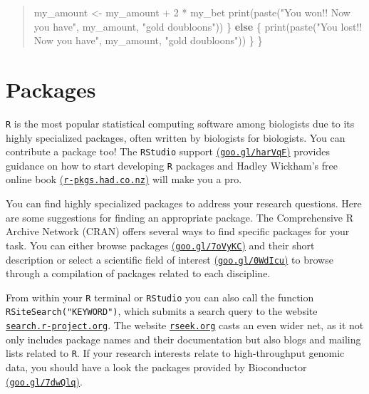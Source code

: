 \documentclass[
  letterpaper,
  DIV=11,
  numbers=noendperiod]{scrreprt}
\newenvironment{Shaded}{\begin{snugshade}}{\end{snugshade}}
\newcommand{\ControlFlowTok}[1]{\textcolor[rgb]{0.00,0.23,0.31}{\textbf{#1}}}
\newcommand{\DecValTok}[1]{\textcolor[rgb]{0.68,0.00,0.00}{#1}}
\newcommand{\FunctionTok}[1]{\textcolor[rgb]{0.28,0.35,0.67}{#1}}
\newcommand{\NormalTok}[1]{\textcolor[rgb]{0.00,0.23,0.31}{#1}}
\newcommand{\OtherTok}[1]{\textcolor[rgb]{0.00,0.23,0.31}{#1}}
\newcommand{\SpecialCharTok}[1]{\textcolor[rgb]{0.37,0.37,0.37}{#1}}
\newcommand{\StringTok}[1]{\textcolor[rgb]{0.13,0.47,0.30}{#1}}
\begin{document}
\begin{quote}
\begin{Shaded}
\begin{Highlighting}[]
\NormalTok{    my\_amount }\OtherTok{\textless{}{-}}\NormalTok{ my\_amount }\SpecialCharTok{+} \DecValTok{2} \SpecialCharTok{*}\NormalTok{ my\_bet}
    \FunctionTok{print}\NormalTok{(}\FunctionTok{paste}\NormalTok{(}\StringTok{"You won!! Now you have"}\NormalTok{, my\_amount, }\StringTok{"gold doubloons"}\NormalTok{))}
\NormalTok{  \} }\ControlFlowTok{else}\NormalTok{ \{}
    \FunctionTok{print}\NormalTok{(}\FunctionTok{paste}\NormalTok{(}\StringTok{"You lost!! Now you have"}\NormalTok{, my\_amount, }\StringTok{"gold doubloons"}\NormalTok{))}
\NormalTok{  \}}
\NormalTok{\}}
\end{Highlighting}
\end{Shaded}
\end{quote}

\section*{Packages}\label{packages}


\texttt{R} is the most popular statistical computing software among
biologists due to its highly specialized packages, often written by
biologists for biologists. You can contribute a package too! The
\texttt{RStudio} support
\href{http://goo.gl/harVqF}{(\texttt{goo.gl/harVqF})} provides guidance
on how to start developing \texttt{R} packages and Hadley Wickham's free
online book \href{http://r-pkgs.had.co.nz}{(\texttt{r-pkgs.had.co.nz})}
will make you a pro.

You can find highly specialized packages to address your research
questions. Here are some suggestions for finding an appropriate package.
The Comprehensive R Archive Network (CRAN) offers several ways to find
specific packages for your task. You can either browse packages
\href{http://goo.gl/7oVyKC}{(\texttt{goo.gl/7oVyKC})} and their short
description or select a scientific field of interest
\href{http://goo.gl/0WdIcu}{(\texttt{goo.gl/0WdIcu})} to browse through
a compilation of packages related to each discipline.

From within your \texttt{R} terminal or \texttt{RStudio} you can also
call the function \texttt{RSiteSearch("KEYWORD")}, which submits a
search query to the website
\href{http://search.r-project.org}{\texttt{search.r-project.org}}. The
website \href{http://rseek.org}{\texttt{rseek.org}} casts an even wider
net, as it not only includes package names and their documentation but
also blogs and mailing lists related to \texttt{R}. If your research
interests relate to high-throughput genomic data, you should have a look
the packages provided by Bioconductor
\href{http://goo.gl/7dwQlq}{(\texttt{goo.gl/7dwQlq})}.
\end{document}
